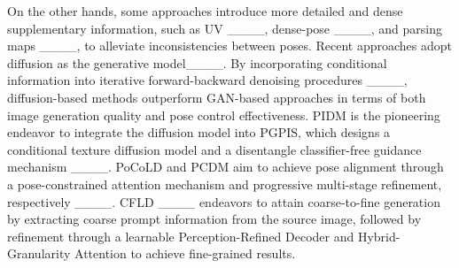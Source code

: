 On the other hands, some approaches introduce more detailed and dense supplementary information, such as UV ____, dense-pose ____, and parsing maps ____, to alleviate inconsistencies between poses. 
Recent approaches adopt diffusion as the generative model____. 
%
By incorporating conditional information into iterative forward-backward denoising procedures ____, diffusion-based methods outperform GAN-based approaches in terms of both image generation quality and pose control effectiveness.
PIDM is the pioneering endeavor to integrate the diffusion model into PGPIS, which designs a conditional texture diffusion model and a disentangle classifier-free guidance mechanism ____. 
PoCoLD and PCDM aim to achieve pose alignment through a pose-constrained attention mechanism and progressive multi-stage refinement, respectively ____.
CFLD ____ endeavors to attain coarse-to-fine generation by extracting coarse prompt information from the source image, followed by refinement through a learnable Perception-Refined Decoder and Hybrid-Granularity Attention to achieve fine-grained results. 
%

